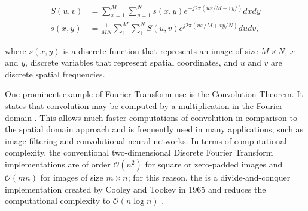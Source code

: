 
\begin{align}
\label{eqn:two_dimensional_discrete_fourier_transform}
S(u,v) &= \sum_{x = 1}^{M}
          \sum_{y = 1}^{N}
          s(x,y) e^{-j 2 \pi 
                    \left(
                        ux/M + vy/
                    \right)
                  }
        dx dy\\
s(x,y) &= \frac{1}{MN}
          \sum_{1}^{M}
          \sum_{1}^{N}
          S(u,v) e^{j 2 \pi 
                    \left(
                        ux/M + vy/N
                    \right)
                  }
        du dv,
\end{align}

\noindent where $s(x,y)$ is a discrete function that represents an image of size $M \times N$, $x$ and $y$, discrete variables that represent spatial coordinates, and $u$ and $v$ are discrete spatial frequencies. 

One prominent example of Fourier Transform use is the Convolution Theorem. It states that convolution may be computed by a multiplication in the Fourier domain \cite{brigham1988fast}. This allows much faster computations of convolution in comparison to the spatial domain approach and is frequently used in many applications, such as image filtering and convolutional neural networks. In terms of computational complexity, the conventional two-dimensional Discrete Fourier Transform implementations are of order $\mathcal{O}(n^{2})$ for square or zero-padded images and $\mathcal{O}(mn)$ for images of size $m \times n$; for this reason, the  is a divide-and-conquer implementation created by Cooley and Tookey in 1965 and reduces the computational complexity to $\mathcal{O}(n \log n)$ \cite{bracewell2000fourier}.